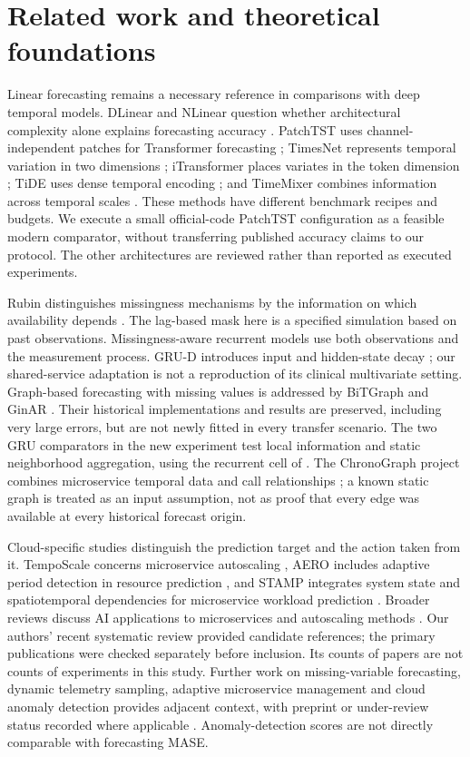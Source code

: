 \section{Related work and theoretical foundations}
Linear forecasting remains a necessary reference in comparisons with deep temporal models. DLinear and NLinear question whether architectural complexity alone explains forecasting accuracy \cite{dlinear}. PatchTST uses channel-independent patches for Transformer forecasting \cite{patchtst}; TimesNet represents temporal variation in two dimensions \cite{timesnet}; iTransformer places variates in the token dimension \cite{itransformer}; TiDE uses dense temporal encoding \cite{tide}; and TimeMixer combines information across temporal scales \cite{timemixer}. These methods have different benchmark recipes and budgets. We execute a small official-code PatchTST configuration as a feasible modern comparator, without transferring published accuracy claims to our protocol. The other architectures are reviewed rather than reported as executed experiments.

Rubin distinguishes missingness mechanisms by the information on which availability depends \cite{rubinmissing}. The lag-based mask here is a specified simulation based on past observations. Missingness-aware recurrent models use both observations and the measurement process. GRU-D introduces input and hidden-state decay \cite{grud}; our shared-service adaptation is not a reproduction of its clinical multivariate setting. Graph-based forecasting with missing values is addressed by BiTGraph \cite{bitgraph} and GinAR \cite{ginar}. Their historical implementations and results are preserved, including very large errors, but are not newly fitted in every transfer scenario. The two GRU comparators in the new experiment test local information and static neighborhood aggregation, using the recurrent cell of \cite{gru}. The ChronoGraph project combines microservice temporal data and call relationships \cite{chronograph}; a known static graph is treated as an input assumption, not as proof that every edge was available at every historical forecast origin.

Cloud-specific studies distinguish the prediction target and the action taken from it. TempoScale concerns microservice autoscaling \cite{temposcale}, AERO includes adaptive period detection in resource prediction \cite{aero}, and STAMP integrates system state and spatiotemporal dependencies for microservice workload prediction \cite{stamp}. Broader reviews discuss AI applications to microservices and autoscaling methods \cite{aimapping,autoscaling2025}. Our authors' recent systematic review provided candidate references; the primary publications were checked separately before inclusion. Its counts of papers are not counts of experiments in this study. Further work on missing-variable forecasting, dynamic telemetry sampling, adaptive microservice management and cloud anomaly detection provides adjacent context, with preprint or under-review status recorded where applicable \cite{ibn,radar2026,taxonomy2026,ibm2026}. Anomaly-detection scores are not directly comparable with forecasting MASE.

